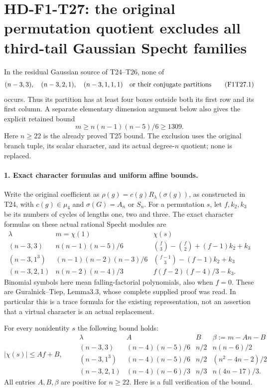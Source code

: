 \section[HD-F1-T27: all third-tail Gaussian Specht sources are excluded]{HD-F1-T27: the original permutation quotient excludes all third-tail Gaussian Specht families}
\label{sec:f1-gaussian-three-tail-exclusion}

In the residual Gaussian source of T24--T26, none of
\[
 (n-3,3),\quad(n-3,2,1),\quad(n-3,1,1,1)
 \quad\hbox{or their conjugate partitions}
 \tag{F1T27.1}
\]
occurs. Thus its partition has at least four boxes outside
both its first row and its first column. A separate elementary
dimension argument below also gives the explicit retained bound
\[
             m\ge n(n-1)(n-5)/6\ge1309.
 \tag{F1T27.2}
\]
Here $n\ge22$ is the already proved T25 bound. The exclusion
uses the original branch tuple, its scalar character, and its
actual degree-$n$ quotient; none is replaced.

\paragraph{1. Exact character formulas and uniform affine bounds.}
Write the original coefficient as
$\rho(g)=c(g)R_\lambda(\sigma(g))$, as constructed in T24,
with $c(g)\in\mu_4$ and $\sigma(G)=A_n$ or $S_n$.
For a permutation $s$, let $f,k_2,k_3$ be its numbers of
cycles of lengths one, two and three. The exact character
formulas on these actual rational Specht modules are
\[
\begin{array}{c|c|c}
\lambda& m=\chi(1)&\chi(s)\\ \hline
(n-3,3)&n(n-1)(n-5)/6&
\binom f3-\binom f2+(f-1)k_2+k_3\\
(n-3,1^3)&(n-1)(n-2)(n-3)/6&
\binom{f-1}3-(f-1)k_2+k_3\\
(n-3,2,1)&n(n-2)(n-4)/3&
f(f-2)(f-4)/3-k_3 .
\end{array}
 \tag{F1T27.3}
\]
Binomial symbols here mean falling-factorial polynomials,
also when $f=0$. These are Guralnick--Tiep, Lemma3.3,
whose complete supplied proof was read. In particular this
is a trace formula for the existing representation, not
an assertion that a virtual character is an actual replacement.

For every nonidentity $s$ the following bound holds:
\[
 |\chi(s)|\le Af+B,\qquad
\begin{array}{c|c|c|c}
\lambda&A&B&\beta:=m-An-B\\ \hline
(n-3,3)&(n-4)(n-5)/6&n/2&n(n-6)/2\\
(n-3,1^3)&(n-4)(n-5)/6&n/2&(n^2-4n-2)/2\\
(n-3,2,1)&(n-4)(n-6)/3&n/3&n(4n-17)/3 .
\end{array}
 \tag{F1T27.4}
\]
All entries $A,B,\beta$ are positive for $n\ge22$.
Here is a full verification of the bound.

